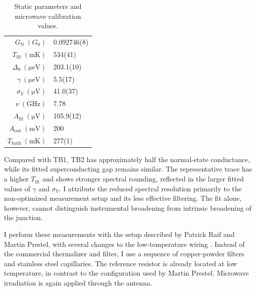         \begin{table}
            \captionsetup{format=plain}%
            \centering
            \footnotesize
            \vspace{-.5em}
            \caption{
                Static parameters and microwave calibration values.
            }%
            \vspace{.5em}%
            \begin{tabular}{r|l}
                $G_\mathrm{N}\ (G_0)$ & 0.092746(8)\\
                $T_\mathrm{fit}\ (\unit{\milli\kelvin})$ & 534(41) \\
                $\Delta_0\ (\unit{\micro\electronvolt})$ & 203.1(10) \\
                $\gamma\ (\unit{\micro\electronvolt})$ & 5.5(17) \\
                $\sigma_V\ (\unit{\micro\volt})$ & 41.0(37) \\
                $\nu\ (\unit{\giga\hertz})$ & 7.78 \\
                $A_\mathrm{fit}\ (\unit{\micro\volt})$ & 105.9(12) \\
                $A_\mathrm{out}\ (\unit{\milli\volt})$& 200 \\
                $T_\mathrm{bath}\ (\unit{\milli\kelvin})$ & 277(1)
            \end{tabular}
            \label{table:tunnelbarrier:asym}
        \end{table}

        Compared with TB1, TB2 has approximately half the normal-state conductance, while its fitted superconducting gap remains similar. The representative trace has a higher $T_\mathrm{fit}$ and shows stronger spectral rounding, reflected in the larger fitted values of $\gamma$ and $\sigma_V$. I attribute the reduced spectral resolution primarily to the non-optimized measurement setup and its less effective filtering. The fit alone, however, cannot distinguish instrumental broadening from intrinsic broadening of the junction.

        I perform these measurements with the setup described by Patrick Raif and Martin Prestel, with several changes to the low-temperature wiring \cite{raif_electronic_2024,prestel_magnetic_2020}. Instead of the commercial thermalizer and filter, I use a sequence of copper-powder filters and stainless steel capillaries. The reference resistor is already located at low temperature, in contrast to the configuration used by Martin Prestel. Microwave irradiation is again applied through the antenna.

